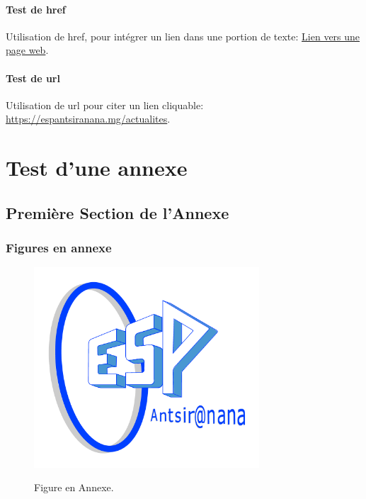 \documentclass[a4paper, oneside, 12pt, memoireMaitrise, francais, creativecommons, hyperref]{memoESPA}
\begin{document}
\subsubsection{Test de href}

Utilisation de href, pour intégrer un lien dans une portion de texte:
\href{https://www.rahombe.com/}{Lien vers une page web}.

\subsubsection{Test de url}

Utilisation de url pour citer un lien cliquable:
\url{https://espantsiranana.mg/actualites}.


\begin{conclusion}

\lipsum[1] %

\end{conclusion}


\appendix

\multiannexe

% 

\chapter{Test d'une annexe}


\section{Première Section de l'Annexe}


\subsection{Figures en annexe}

\begin{figure}
	\centering
		\includegraphics[width=0.75\textwidth]{figures/logoESPA.png}
	 \\ \parbox{0.75\textwidth}{\caption{Figure en Annexe.}\label{fig:testAp}}
\end{figure}
\end{document}
